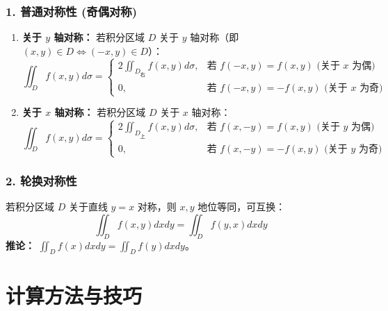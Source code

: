 \documentclass[a4paper,12pt]{ctexart}
\begin{document}
\subsubsection{1. 普通对称性 (奇偶对称)}
\begin{enumerate}
    \item \textbf{关于 $y$ 轴对称：} 若积分区域 $D$ 关于 $y$ 轴对称（即 $(x,y) \in D \Leftrightarrow (-x,y) \in D$）：
    \[ \iint_D f(x,y) d\sigma = \begin{cases} 2 \iint_{D_{\text{右}}} f(x,y) d\sigma, & \text{若 } f(-x,y) = f(x,y) \text{ (关于 } x \text{ 为偶)} \\ 0, & \text{若 } f(-x,y) = -f(x,y) \text{ (关于 } x \text{ 为奇)} \end{cases} \]
    
    \item \textbf{关于 $x$ 轴对称：} 若积分区域 $D$ 关于 $x$ 轴对称：
    \[ \iint_D f(x,y) d\sigma = \begin{cases} 2 \iint_{D_{\text{上}}} f(x,y) d\sigma, & \text{若 } f(x,-y) = f(x,y) \text{ (关于 } y \text{ 为偶)} \\ 0, & \text{若 } f(x,-y) = -f(x,y) \text{ (关于 } y \text{ 为奇)} \end{cases} \]
\end{enumerate}

\subsubsection{2. 轮换对称性}
若积分区域 $D$ 关于直线 $y=x$ 对称，则 $x, y$ 地位等同，可互换：
\[ \iint_D f(x,y) dxdy = \iint_D f(y,x) dxdy \]
\textbf{推论：} $\iint_D f(x) dxdy = \iint_D f(y) dxdy$。

\section{计算方法与技巧}
\end{document}
